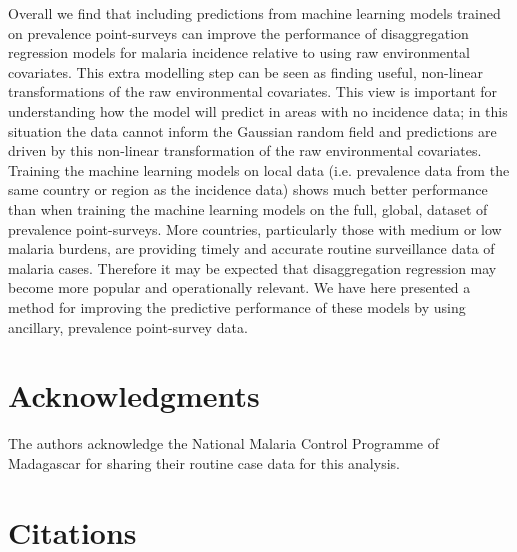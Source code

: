 \documentclass[review]{elsarticle}
\begin{document}
Overall we find that including predictions from machine learning models trained on prevalence point-surveys can improve the performance of disaggregation regression models for malaria incidence relative to using raw environmental covariates.
This extra modelling step can be seen as finding useful, non-linear transformations of the raw environmental covariates.
This view is important for understanding how the model will predict in areas with no incidence data; in this situation the data cannot inform the Gaussian random field and predictions are driven by this non-linear transformation of the raw environmental covariates.
Training the machine learning models on local data (i.e. prevalence data from the same country or region as the incidence data) shows much better performance than when training the machine learning models on the full, global, dataset of prevalence point-surveys.
More countries, particularly those with medium or low malaria burdens, are providing timely and accurate routine surveillance data of malaria cases.
Therefore it may be expected that disaggregation regression may become more popular and operationally relevant.
We have here presented a method for improving the predictive performance of these models by using ancillary, prevalence point-survey data.



\section*{Acknowledgments}
The authors acknowledge the National Malaria Control Programme of Madagascar for sharing their routine case data for this analysis.

\section*{Citations}
 
%
%
\end{document}
